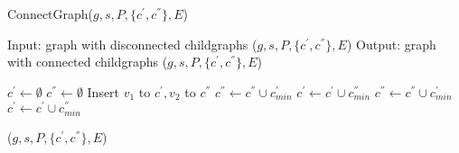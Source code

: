 \begin{algorithm}
\caption{ConnectGraph($g,s,P,\{c^{'},c^{''}\},E$)}
\label{alg:alg03}
\begin{algorithmic}
\STATE Input: graph with disconnected childgraphs ($g,s,P,\{c^{'},c^{''}\},E$)
\STATE Output: graph with connected childgraphs ($g,s,P,\{c^{'},c^{''}\},E$)
\end{algorithmic}
\begin{algorithmic}[1]
\STATE $c^{'} \leftarrow  \emptyset $ 
\STATE $c^{''} \leftarrow  \emptyset $ 
   \STATE Insert $v_{1}$ to $c^{'}, v_{2}$ to $c^{''}$
\ELSE 
\REPEAT
                  \STATE $  c^{''} \leftarrow c^{''} \cup  c^{'}_{min} $
             \ELSE
                \STATE $  c^{'} \leftarrow c^{'} \cup c^{''}_{min} $
             \ENDIF
        \ELSE
                   \STATE $  c^{''} \leftarrow c^{''} \cup c^{'}_{min} $
                \ELSE
                   \STATE $  c^{'} \leftarrow c^{'} \cup c^{''}_{min}$ 
                \ENDIF
        \ENDIF


\ENDIF
\RETURN ($g,s,P,\{c^{'},c^{''}\},E$)
\end{algorithmic}
\end{algorithm}


